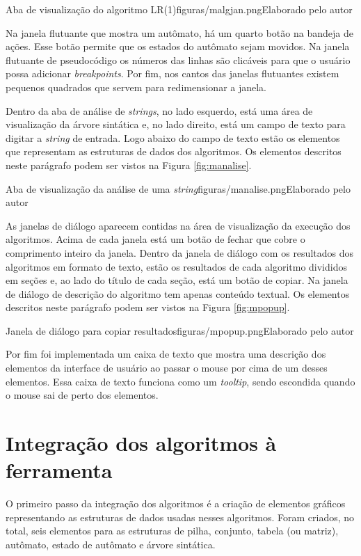 \begin{mypicture}{\label{fig:malgjan}}{Aba de visualização do algoritmo LR(1)}{figuras/malgjan.png}{Elaborado pelo autor}
\end{mypicture}

Na janela flutuante que mostra um autômato, há um quarto botão na bandeja de ações. Esse botão permite que os estados do autômato sejam movidos. Na janela flutuante de pseudocódigo os números das linhas são clicáveis para que o usuário possa adicionar \textit{breakpoints}. Por fim, nos cantos das janelas flutuantes existem pequenos quadrados que servem para redimensionar a janela.



Dentro da aba de análise de \textit{strings}, no lado esquerdo, está uma área de visualização da árvore sintática e, no lado direito, está um campo de texto para digitar a \textit{string} de entrada. Logo abaixo do campo de texto estão os elementos que representam as estruturas de dados dos algoritmos. Os elementos descritos neste parágrafo podem ser vistos na Figura \ref{fig:manalise}.

\begin{mypicture}{\label{fig:manalise}}{Aba de visualização da análise de uma \textit{string}}{figuras/manalise.png}{Elaborado pelo autor}
\end{mypicture}

As janelas de diálogo aparecem contidas na área de visualização da execução dos algoritmos. Acima de cada janela está um botão de fechar que cobre o comprimento inteiro da janela. Dentro da janela de diálogo com os resultados dos algoritmos em formato de texto, estão os resultados de cada algoritmo divididos em seções e, ao lado do título de cada seção, está um botão de copiar. Na janela de diálogo de descrição do algoritmo tem apenas conteúdo textual. Os elementos descritos neste parágrafo podem ser vistos na Figura \ref{fig:mpopup}.

\begin{mypicture}{ \label{fig:mpopup}}{Janela de diálogo para copiar resultados}{figuras/mpopup.png}{Elaborado pelo autor}
\end{mypicture}

Por fim foi implementada um caixa de texto que mostra uma descrição dos elementos da interface de usuário ao passar o mouse por cima de um desses elementos. Essa caixa de texto funciona como um \textit{tooltip}, sendo escondida quando o mouse sai de perto dos elementos.

\section{Integração dos algoritmos à ferramenta}
O primeiro passo da integração dos algoritmos é a criação de elementos gráficos representando as estruturas de dados usadas nesses algoritmos. Foram criados, no total, seis elementos para as estruturas de pilha, conjunto, tabela (ou matriz), autômato, estado de autômato e árvore sintática.


